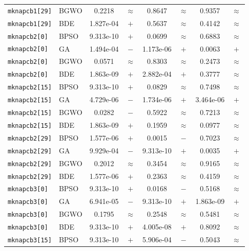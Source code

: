 \documentclass[journal,article,submit,moreauthors]{Definitions/mdpi}
\begin{document}
\begin{longtable}{llcccccc}
    \texttt{mknapcb1[29]} & BGWO  &    0.2218 & $\approx$ &    0.8647 & $\approx$ &    0.9357 & $\approx$ \\
    \texttt{mknapcb1[29]} & BDE   & 1.827e-04 & $+$ &    0.5637 & $\approx$ &    0.4142 & $\approx$ \\
    \midrule
    \texttt{mknapcb2[0]} & BPSO  & 9.313e-10 & $+$ &    0.0699 & $\approx$ &    0.6883 & $\approx$ \\
    \texttt{mknapcb2[0]} & GA    & 1.494e-04 & $-$ & 1.173e-06 & $+$ &    0.0063 & $+$ \\
    \texttt{mknapcb2[0]} & BGWO  &    0.0571 & $\approx$ &    0.8303 & $\approx$ &    0.2473 & $\approx$ \\
    \texttt{mknapcb2[0]} & BDE   & 1.863e-09 & $+$ & 2.882e-04 & $+$ &    0.3777 & $\approx$ \\
    \midrule
    \texttt{mknapcb2[15]} & BPSO  & 9.313e-10 & $+$ &    0.0829 & $\approx$ &    0.7498 & $\approx$ \\
    \texttt{mknapcb2[15]} & GA    & 4.729e-06 & $-$ & 1.734e-06 & $+$ & 3.464e-06 & $+$ \\
    \texttt{mknapcb2[15]} & BGWO  &    0.0282 & $-$ &    0.5922 & $\approx$ &    0.7213 & $\approx$ \\
    \texttt{mknapcb2[15]} & BDE   & 1.863e-09 & $+$ &    0.1959 & $\approx$ &    0.0977 & $\approx$ \\
    \midrule
    \texttt{mknapcb2[29]} & BPSO  & 1.577e-06 & $+$ &    0.0015 & $-$ &    0.7023 & $\approx$ \\
    \texttt{mknapcb2[29]} & GA    & 9.929e-04 & $-$ & 9.313e-10 & $+$ &    0.0035 & $+$ \\
    \texttt{mknapcb2[29]} & BGWO  &    0.2012 & $\approx$ &    0.3454 & $\approx$ &    0.9165 & $\approx$ \\
    \texttt{mknapcb2[29]} & BDE   & 1.577e-06 & $+$ &    0.2363 & $\approx$ &    0.4159 & $\approx$ \\
    \midrule
    \texttt{mknapcb3[0]} & BPSO  & 9.313e-10 & $+$ &    0.0168 & $-$ &    0.5168 & $\approx$ \\
    \texttt{mknapcb3[0]} & GA    & 6.941e-05 & $-$ & 9.313e-10 & $+$ & 1.863e-09 & $+$ \\
    \texttt{mknapcb3[0]} & BGWO  &    0.1795 & $\approx$ &    0.2548 & $\approx$ &    0.5481 & $\approx$ \\
    \texttt{mknapcb3[0]} & BDE   & 9.313e-10 & $+$ & 4.005e-08 & $+$ &    0.8092 & $\approx$ \\
    \midrule
    \texttt{mknapcb3[15]} & BPSO  & 9.313e-10 & $+$ & 5.906e-04 & $-$ &    0.5043 & $\approx$ \\

\end{longtable}
\end{document}
